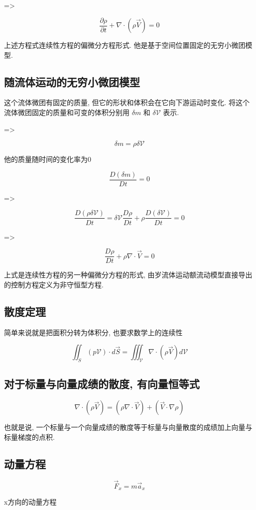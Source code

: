 \documentclass[UTF8]{ctexart}
\begin{document}
=>

$$
	\frac{\partial \rho}{\partial t} + \nabla \cdot (\rho \vec{V}) = 0
$$

上述方程式连续性方程的偏微分方程形式. 他是基于空间位置固定的无穷小微团模型.

\subsection{随流体运动的无穷小微团模型}
这个流体微团有固定的质量, 但它的形状和体积会在它向下游运动时变化. 将这个流体微团固定的质量和可变的体积分别用 $\delta m$ 和 $\delta \mathcal{V}$ 表示.

=>

$$
	\delta m = \rho \delta \mathcal{V}
$$

他的质量随时间的变化率为0

$$
	\frac{D(\delta m)}{Dt} = 0
$$

=>

$$
	\frac{D(\rho \delta \mathcal{V})}{Dt} = \delta \mathcal{V} \frac{D\rho}{Dt} + \rho \frac{D(\delta \mathcal{V})}{Dt} = 0
$$

=>

$$
	\frac{D\rho}{Dt} + \rho \nabla \cdot \vec{V} = 0
$$

上式是连续性方程的另一种偏微分方程的形式, 由岁流体运动额流动模型直接导出的控制方程定义为非守恒型方程.

\subsection{散度定理}
简单来说就是把面积分转为体积分, 也要求数学上的连续性

$$
	\iint_{S}(p\mathcal{V})\cdot d\vec{S} = \iiint_{\mathcal{V}} \nabla \cdot (\rho \vec{V}) d \mathcal{V}
$$
\subsection{对于标量与向量成绩的散度, 有向量恒等式}

$$
	\nabla \cdot (\rho \vec{V}) = (\rho \nabla \cdot \vec{V}) + (\vec{V} \cdot \nabla \rho)
$$

也就是说, 一个标量与一个向量成绩的散度等于标量与向量散度的成绩加上向量与标量梯度的点积.
\subsection{动量方程}

$$
	\vec{F}_{x} = m \vec{a}_x
$$

x方向的动量方程
\end{document}
